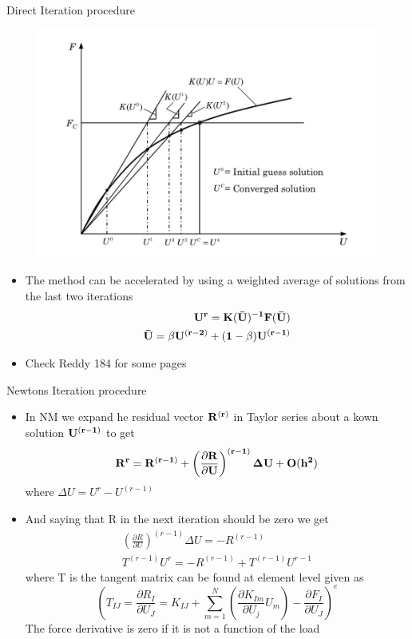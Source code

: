 	\begin{frame}{Direct Iteration procedure}
		\begin{figure}
			\centering
			\includegraphics[width=0.5\linewidth]{Figure/fig14} 
		\end{figure}
		\begin{itemize}
			\item The method can be accelerated by using a weighted average of solutions from the last two iterations
		\begin{equation}
			\begin{aligned}
				\mathbf{U^r = K(\bar{U})^{-1}F(\bar{U})} \\
				\mathbf{\bar{U} = \beta U^{(r-2)} + (1-\beta)U^{(r-1)}}
			\end{aligned}
		\end{equation}
			\item Check Reddy 184 for some pages
		\end{itemize}
	\end{frame}


	\begin{frame}{Newtons Iteration procedure}
		\begin{itemize}
			\item In NM we expand he residual vector $\mathbf{R^{(r)}}$ in Taylor series about a kown solution $\mathbf{U^{(r-1)}}$ to get
			\begin{equation}
				\mathbf{R^r = R^{(r-1)} + \left(\frac{\partial R}{\partial U} \right)^{(r-1)} {\Delta} U + O(h^2)}
			\end{equation}
			where $\Delta U =  U^r - U^{(r-1)}$
			\item And saying that R in the next iteration should be zero we get
			\begin{equation}
			\begin{aligned}
				\left(\frac{\partial R}{\partial U} \right)^{(r-1)}\Delta U = -R^{(r-1)} \\
				T^{(r-1)} U^r = -R^{(r-1)}  + T^{(r-1)} U^{r-1}
			\end{aligned}
			\end{equation} 
			where T is the tangent matrix can be found at element level given as
			\begin{equation}
			\left(T_{IJ} = \frac{\partial R_I}{\partial U_J} = K_{IJ} + \sum_{m=1}^{N} \left(
			\frac{\partial K_{Im}}{\partial U_j} U_m\right) - \frac{\partial F_I}{\partial U_J} \right)^e
			\end{equation}
			The force derivative is zero if it is not a function of the load
		\end{itemize}
	\end{frame}


